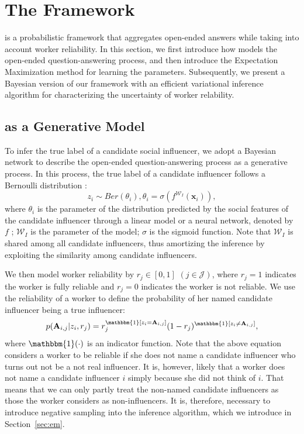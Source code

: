 \section{The \sys Framework}

\sys is a probabilistic framework that aggregates open-ended answers while taking into account worker reliability. In this section, we first introduce how \sys models the open-ended question-answering process, and then introduce the Expectation Maximization method for learning the parameters. Subsequently, we present a Bayesian version of our framework with an efficient variational inference algorithm for characterizing the uncertainty of worker relability. 

\subsection{\sys as a Generative Model}
To infer the true label of a candidate social influencer, we adopt a Bayesian network to describe the open-ended question-answering process as a generative process. In this process, the true label of a candidate influencer follows a Bernoulli distribution :
%
\begin{equation}
    z_i \sim Ber(\theta_i), \theta_i  = \sigma (f^{\mathcal{W}_I}(\mathbf{x}_i)),
    \label{eq:dis_item}
\end{equation}
%
where $\theta_i$ is the parameter of the distribution predicted by the social features of the candidate influencer through a linear model or a neural network, denoted by $f$ ; $\mathcal{W}_I$ is the parameter of the model; $\sigma$ is the sigmoid function. Note that $\mathcal{W}_I$ is shared among all candidate influencers, thus amortizing the inference \cite{gershman2014amortized} by exploiting the similarity among candidate influencers. 


We then model worker reliability by $r_j \in [0,1]$ $(j\in \mathcal{J})$, where $r_j=1$ indicates the worker is fully reliable and $r_j=0$ indicates the worker is not reliable. We use the reliability of a worker to define the probability of her named candidate influencer being a true influencer:
%
\begin{equation}
    p(\mathbf{A}_{i,j} | z_i,  r_j) = r_j^{\mathbbm{1}[z_i=\mathbf{A}_{i,j}]} (1- r_j)^{\mathbbm{1}[z_i\ne \mathbf{A}_{i,j}]},
    \label{eq:item_worker}
\end{equation}
%
where $\mathbbm{1}(\cdot)$ is an indicator function. Note that the above equation  considers a worker to be reliable if she does not name a candidate influencer who turns out not be a not real influencer. It is, however, likely that a worker does not name a candidate influencer $i$ simply because she did not think of $i$. That means that we can only partly treat the non-named candidate influencers as those the worker considers as non-influencers. It is, therefore, necessary to introduce negative sampling into the inference algorithm, which we introduce in Section~\ref{sec:em}. 

